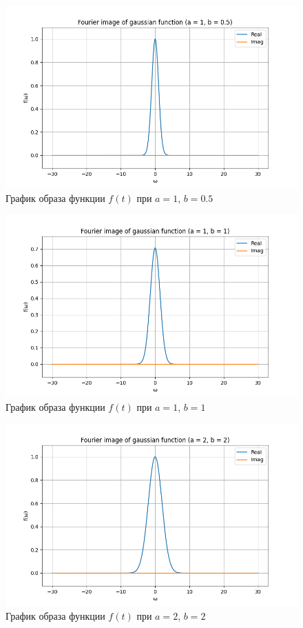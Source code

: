 \begin{figure}[ht!]
    \centering
    \includegraphics[width=\textwidth]{media/gaussian_1_image.png}
    \caption{График образа функции $f(t)$ при $a = 1$, $b = 0.5$}
    \label{fig:gaussian_1_image}
\end{figure}

\begin{figure}[ht!]
    \centering
    \includegraphics[width=\textwidth]{media/gaussian_2_image.png}
    \caption{График образа функции $f(t)$ при $a = 1$, $b = 1$}
    \label{fig:gaussian_2_image}
\end{figure}

\begin{figure}[ht!]
    \centering
    \includegraphics[width=\textwidth]{media/gaussian_3_image.png}
    \caption{График образа функции $f(t)$ при $a = 2$, $b = 2$}
    \label{fig:gaussian_3_image}
\end{figure}

